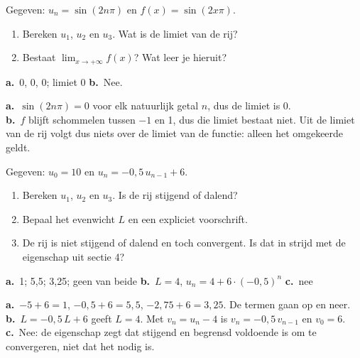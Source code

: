 \begin{oefeningen}
\begin{oefening}[2]
Gegeven: $u_n = \sin(2n\pi)$ en $f(x) = \sin(2x\pi)$.
\begin{enumerate}
  \item Bereken $u_1$, $u_2$ en $u_3$. Wat is de limiet van de rij?
  \item Bestaat $\displaystyle\lim_{x\to+\infty} f(x)$? Wat leer je hieruit?
\end{enumerate}
\begin{solution}
\textbf{a.}~0, 0, 0; limiet 0 \quad \textbf{b.}~Nee.
\end{solution}
\begin{fullsolution}
\textbf{a.}~$\sin(2n\pi)=0$ voor elk natuurlijk getal $n$, dus de limiet is 0.\\
\textbf{b.}~$f$ blijft schommelen tussen $-1$ en 1, dus die limiet bestaat niet. Uit de limiet van de rij volgt dus niets over de limiet van de functie: alleen het omgekeerde geldt.
\end{fullsolution}
\end{oefening}

\begin{oefening}[2]
Gegeven: $u_0 = 10$ en $u_n = -0{,}5\,u_{n-1} + 6$.
\begin{enumerate}
  \item Bereken $u_1$, $u_2$ en $u_3$. Is de rij stijgend of dalend?
  \item Bepaal het evenwicht $L$ en een expliciet voorschrift.
  \item De rij is niet stijgend of dalend en toch convergent. Is dat in strijd met de eigenschap uit sectie 4?
\end{enumerate}
\begin{solution}
\textbf{a.}~1; 5,5; 3,25; geen van beide \quad \textbf{b.}~$L=4$, $u_n=4+6\cdot(-0{,}5)^n$ \quad \textbf{c.}~nee
\end{solution}
\begin{fullsolution}
\textbf{a.}~$-5+6=1$, $-0{,}5+6=5{,}5$, $-2{,}75+6=3{,}25$. De termen gaan op en neer.\\
\textbf{b.}~$L=-0{,}5\,L+6$ geeft $L=4$. Met $v_n=u_n-4$ is $v_n=-0{,}5\,v_{n-1}$ en $v_0=6$.\\
\textbf{c.}~Nee: de eigenschap zegt dat stijgend en begrensd voldoende is om te convergeren, niet dat het nodig is.
\end{fullsolution}
\end{oefening}


\end{oefeningen}
